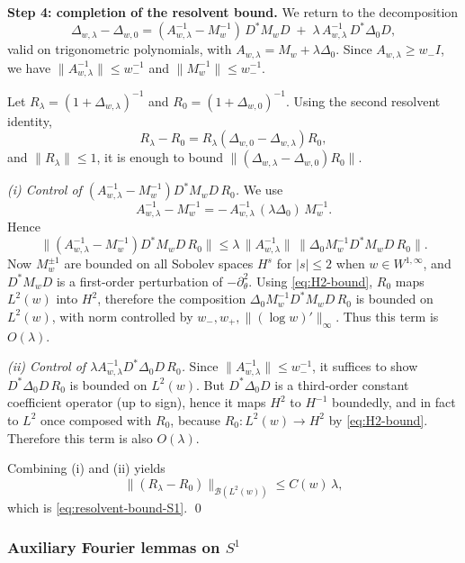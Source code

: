 \documentclass{amsart}
\numberwithin{equation}{section}
\theoremstyle{definition}
\theoremstyle{remark}
\begin{document}
\medskip
\noindent\textbf{Step 4: completion of the resolvent bound.}
We return to the decomposition
\begin{equation}\label{eq:Delta-diff-decomp-fourier}
\Delta_{w,\lambda}-\Delta_{w,0}
=
(A_{w,\lambda}^{-1}-M_w^{-1})\,D^*M_wD
\;+\;
\lambda\,A_{w,\lambda}^{-1}\,D^*\Delta_0 D,
\end{equation}
valid on trigonometric polynomials, with $A_{w,\lambda}=M_w+\lambda\Delta_0$.
Since $A_{w,\lambda}\ge w_-I$, we have $\|A_{w,\lambda}^{-1}\|\le w_-^{-1}$ and
$\|M_w^{-1}\|\le w_-^{-1}$.

Let $R_\lambda=(1+\Delta_{w,\lambda})^{-1}$ and $R_0=(1+\Delta_{w,0})^{-1}$.
Using the second resolvent identity,
\[
R_\lambda-R_0 = R_\lambda(\Delta_{w,0}-\Delta_{w,\lambda})R_0,
\]
and $\|R_\lambda\|\le1$, it is enough to bound
\(
\|(\Delta_{w,\lambda}-\Delta_{w,0})R_0\|.
\)

\smallskip
\noindent
\emph{(i) Control of $(A_{w,\lambda}^{-1}-M_w^{-1})D^*M_wD\,R_0$.}
We use
\[
A_{w,\lambda}^{-1}-M_w^{-1}
=
-\,A_{w,\lambda}^{-1}\,(\lambda\Delta_0)\,M_w^{-1}.
\]
Hence
\[
\|(A_{w,\lambda}^{-1}-M_w^{-1})D^*M_wD\,R_0\|
\le
\lambda\,\|A_{w,\lambda}^{-1}\|\,\|\Delta_0 M_w^{-1}D^*M_wD\,R_0\|.
\]
Now $M_w^{\pm1}$ are bounded on all Sobolev spaces $H^s$ for $|s|\le 2$ when $w\in W^{1,\infty}$,
and $D^*M_wD$ is a first-order perturbation of $-\partial_\theta^2$.
Using \eqref{eq:H2-bound}, $R_0$ maps $L^2(w)$ into $H^2$, therefore the composition
$\Delta_0 M_w^{-1}D^*M_wD\,R_0$ is bounded on $L^2(w)$, with norm controlled by $w_-,w_+,\|(\log w)'\|_\infty$.
Thus this term is $O(\lambda)$.

\smallskip
\noindent
\emph{(ii) Control of $\lambda A_{w,\lambda}^{-1}D^*\Delta_0D\,R_0$.}
Since $\|A_{w,\lambda}^{-1}\|\le w_-^{-1}$, it suffices to show
$D^*\Delta_0D\,R_0$ is bounded on $L^2(w)$.
But $D^*\Delta_0D$ is a third-order constant coefficient operator (up to sign),
hence it maps $H^2$ to $H^{-1}$ boundedly, and in fact to $L^2$ once composed with $R_0$,
because $R_0:L^2(w)\to H^2$ by \eqref{eq:H2-bound}.
Therefore this term is also $O(\lambda)$.

\smallskip
Combining (i) and (ii) yields
\[
\|(R_\lambda-R_0)\|_{\mathcal B(L^2(w))}\le C(w)\,\lambda,
\]
which is \eqref{eq:resolvent-bound-S1}.
\qed

\subsubsection{Auxiliary Fourier lemmas on $S^1$}
\label{subsubsec:aux-lemmas-S1}
\end{document}
